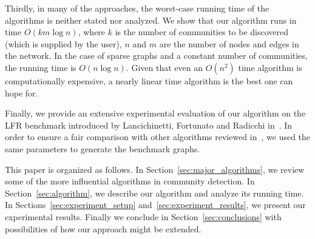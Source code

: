 Thirdly, in many of the approaches, the worst-case running time of the algorithms 
is neither stated nor analyzed. We show that our algorithm runs in time $O(k m \log n)$, 
where $k$ is the number of communities to be discovered (which is supplied by the user), 
$n$ and $m$ are the number of nodes and edges in the network. In the case of sparse graphs 
and a constant number of communities, the running time is $O(n \log n)$. Given that even 
an $O(n^2)$ time algorithm is computationally expensive, a nearly linear time algorithm 
is the best one can hope for.

Finally, we provide an extensive experimental evaluation of our algorithm on the LFR benchmark
introduced by Lancichinetti, Fortunato and Radicchi in~\cite{LFR08, LF09}. In order to ensure 
a fair comparison with other algorithms reviewed in~\cite{LF09}, we used the same parameters 
to generate the benchmark graphs. 


This paper is organized as follows. In Section~\ref{sec:major_algorithms}, we review some 
of the more influential algorithms in community detection. In Section~\ref{sec:algorithm}, we 
describe our algorithm and analyze its running time. In Sections~\ref{sec:experiment_setup} 
and~\ref{sec:experiment_results}, we present our experimental results. Finally we conclude 
in Section~\ref{sec:conclusions} with possibilities of how our approach might be extended. 



